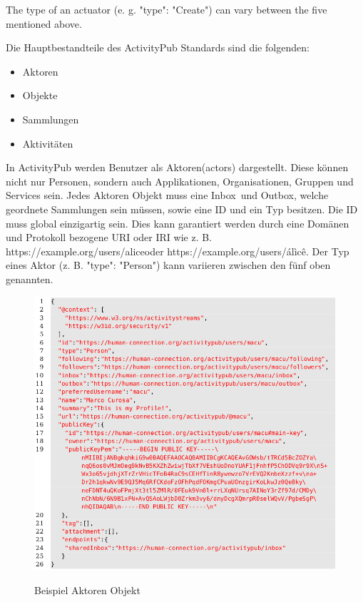 {	The type of an actuator (e. g. "type": "Create") can vary between the five mentioned above.
}{	
	Die Hauptbestandteile des ActivityPub Standards sind die folgenden:
	\begin{itemize}
		\item Aktoren
		\item Objekte
		\item Sammlungen
		\item Aktivitäten
	\end{itemize}
	In ActivityPub werden Benutzer als \glqq Aktoren\grqq(actors) dargestellt. Diese können nicht nur Personen, sondern auch Applikationen, Organisationen, Gruppen und Services sein\cite{activityStreamsCore}. Jedes Aktoren Objekt muss eine \glqq Inbox\grqq~und \glqq Outbox\grqq, welche geordnete Sammlungen sein müssen, sowie eine ID und ein Typ besitzen\cite{activityPub}. Die ID muss global einzigartig sein. Dies kann garantiert werden durch eine Domänen und Protokoll bezogene URI oder IRI wie z. B. \glqq https://example.org/users/alice\grqq oder \glqq https://example.org/users/álìcê\grqq. Der Typ eines Aktor (z. B. "type": "Person") kann variieren zwischen den fünf oben genannten.\\
	\begin{figure}[h]
		\begin{minipage}{\textwidth}
			\centering
			\includegraphics[scale=0.5]{figures/actor.png}
			\label{fig:actor}
			\caption{Beispiel Aktoren Objekt}
		\end{minipage}
	\end{figure}
}
